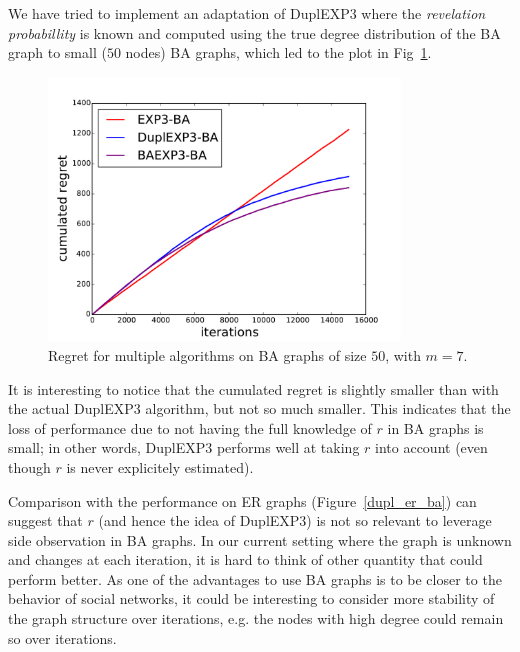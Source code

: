 \documentclass[10pt,a4paper]{scrartcl}
\begin{document}
We have tried to implement an adaptation of DuplEXP3 where the \emph{revelation probabillity} is known and computed using the true degree distribution of the BA graph to small ($50$ nodes) BA graphs, which led to the plot in Fig~\ref{dupl_ba_finite_ba}.

\begin{figure}[h!]
\centering
\includegraphics[height=7cm]{figures/50Kestim_BAdupl_big.pdf} %
 \caption{Regret for multiple algorithms on BA graphs of size $50$, with $m=7$.}
 \label{dupl_ba_finite_ba}
\end{figure}

 It is interesting to notice that the cumulated regret is slightly smaller than with the actual DuplEXP3 algorithm, but not so much smaller. This indicates that the loss of performance due to not having the full knowledge of $r$ in BA graphs is small; in other words, DuplEXP3 performs well at taking $r$ into account (even though $r$ is never explicitely estimated). 

Comparison with the performance on ER graphs (Figure~\ref{dupl_er_ba}) can suggest that $r$ (and hence the idea of  DuplEXP3) is not so relevant to leverage side observation in BA graphs. In our current setting where the graph is unknown and changes at each iteration, it is hard to think of other quantity that could perform better. As one of the advantages to use BA graphs is to be closer to the behavior of social networks, it could be interesting to consider more stability of the graph structure over iterations, e.g. the nodes with high degree could remain so over iterations. 
\end{document}
